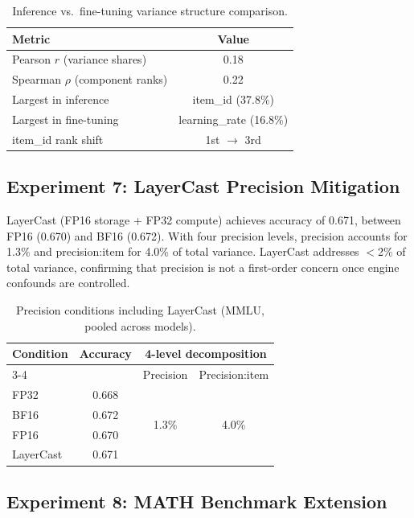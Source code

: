 \documentclass[11pt]{article}
\begin{document}
\begin{table}[t]
\centering
\caption{Inference vs.\ fine-tuning variance structure comparison.}
\label{tab:inf_ft_corr}
\begin{tabular}{lc}
\toprule
Metric & Value \\
\midrule
Pearson $r$ (variance shares) & 0.18 \\
Spearman $\rho$ (component ranks) & 0.22 \\
Largest in inference    & item\_id (37.8\%) \\
Largest in fine-tuning  & learning\_rate (16.8\%) \\
item\_id rank shift     & 1st $\to$ 3rd \\
\bottomrule
\end{tabular}
\end{table}

\subsection{Experiment 7: LayerCast Precision Mitigation}

LayerCast (FP16 storage + FP32 compute) achieves accuracy of 0.671, between FP16 (0.670) and BF16 (0.672).
With four precision levels, precision accounts for 1.3\% and precision:item for 4.0\% of total variance.
LayerCast addresses $<$2\% of total variance, confirming that precision is not a first-order concern once engine confounds are controlled.

\begin{table}[t]
\centering
\caption{Precision conditions including LayerCast (MMLU, pooled across models).}
\label{tab:layercast}
\begin{tabular}{lccc}
\toprule
Condition & Accuracy & \multicolumn{2}{c}{4-level decomposition} \\
\cmidrule(lr){3-4}
 & & Precision & Precision:item \\
\midrule
FP32      & 0.668 & \multirow{4}{*}{1.3\%} & \multirow{4}{*}{4.0\%} \\
BF16      & 0.672 & & \\
FP16      & 0.670 & & \\
LayerCast & 0.671 & & \\
\bottomrule
\end{tabular}
\end{table}

\subsection{Experiment 8: MATH Benchmark Extension}
\label{sec:exp8}
\end{document}
